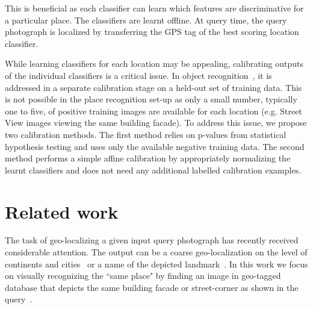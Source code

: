   This is beneficial as  each classifier can learn which features are discriminative for a particular place. The classifiers are learnt offline. At query time, the query photograph is localized by transferring the GPS tag of the best scoring location classifier.

  While learning classifiers for each 
  \textcolor{petr}{location} 
  may be appealing, calibrating outputs of the individual classifiers is a critical issue. In object recognition~\cite{Malisiewicz11}, it is addressed in a separate calibration stage on a held-out set of training data.
  This is not possible in the place recognition set-up as only a small number, typically one to five, of positive training images are available for each location (e.g. Street View images viewing the same building facade). To address this issue, we propose two calibration methods. 
  The first method relies on p-values from statistical hypothesis testing and uses only the available negative training data. The second method performs a simple affine calibration by appropriately normalizing the learnt classifiers and does not need any additional labelled calibration examples.   



\section{Related work} 
\label{sec:related}

  The task of geo-localizing a given input query photograph has recently received considerable attention. The output can be a coarse geo-localization on the level of continents and cities~\cite{Doersch12,Hays2008,Kalogerakis09} or a name of the depicted landmark~\cite{Li09}.  In this work we focus on visually recognizing the ``same place" by finding an image in geo-tagged database that depicts the same building facade or street-corner as shown in the query~\cite{Chen11,Cummins09,Knopp2010,Schindler07,Torii2013,Zamir10}.



